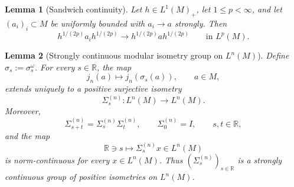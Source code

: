 \documentclass[10pt,a4paper]{amsart}
\newtheorem{lemma}{Lemma}
\begin{document}
\begin{lemma}[Sandwich continuity]\label{lem:sandwich-continuity}
Let \(h\in L^1(M)_+\), let \(1\le p<\infty\), and let
\((a_i)_i\subset M\) be uniformly bounded with \(a_i\to a\) strongly.  Then
\[
        h^{1/(2p)}a_i h^{1/(2p)}
        \longrightarrow
        h^{1/(2p)}a h^{1/(2p)}
        \qquad\text{in }L^p(M).
\]
\end{lemma}

\begin{lemma}[Strongly continuous modular isometry group on \(L^n(M)\)]
\label{lem:modular-Ln-group}
Define $\sigma_s:= \sigma_s^\omega$.
For every \(s\in\mathbb R\), the map
\[
        j_n(a)\longmapsto j_n(\sigma_s(a)),
        \qquad a\in M,
\]
extends uniquely to a positive surjective isometry
\[
        \Sigma_s^{(n)}:L^n(M)\longrightarrow L^n(M).
\]
Moreover,
\begin{equation}
\label{eq:Sigma-group-property}
        \Sigma_{s+t}^{(n)}
        =
        \Sigma_s^{(n)}\Sigma_t^{(n)},
        \qquad
        \Sigma_0^{(n)}=I,
        \qquad s,t\in\mathbb R,
\end{equation}
and the map
\[
        \mathbb R\ni s\longmapsto \Sigma_s^{(n)}x\in L^n(M)
\]
is norm-continuous for every \(x\in L^n(M)\).  Thus
\((\Sigma_s^{(n)})_{s\in\mathbb R}\) is a strongly continuous group of
positive isometries on \(L^n(M)\).
\end{lemma}
\end{document}
